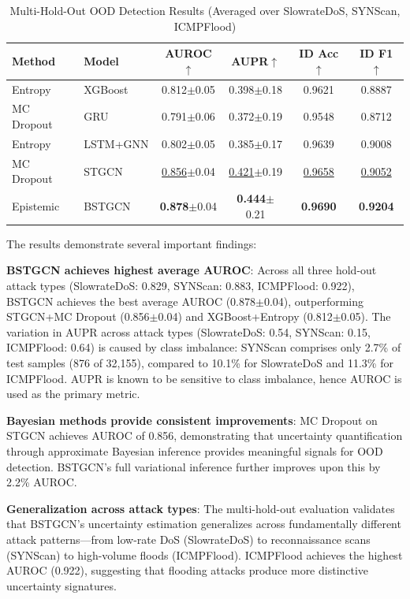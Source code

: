 \documentclass[lettersize,journal]{IEEEtran}
\begin{document}
\begin{table}[!t]
\caption{Multi-Hold-Out OOD Detection Results (Averaged over SlowrateDoS, SYNScan, ICMPFlood)\label{tab:ood_results}}
\centering
\setlength{\tabcolsep}{3pt}
\begin{tabular}{llcccc}
\toprule
\textbf{Method} & \textbf{Model} & \textbf{AUROC}$\uparrow$ & \textbf{AUPR}$\uparrow$ & \textbf{ID Acc}$\uparrow$ & \textbf{ID F1}$\uparrow$ \\
\midrule
Entropy    & XGBoost   & 0.812$\pm$0.05 & 0.398$\pm$0.18 & 0.9621 & 0.8887 \\
MC Dropout & GRU       & 0.791$\pm$0.06 & 0.372$\pm$0.19 & 0.9548 & 0.8712 \\
Entropy    & LSTM+GNN  & 0.802$\pm$0.05 & 0.385$\pm$0.17 & 0.9639 & 0.9008 \\
MC Dropout & STGCN     & \underline{0.856}$\pm$0.04 & \underline{0.421}$\pm$0.19 & \underline{0.9658} & \underline{0.9052} \\
\midrule
Epistemic  & BSTGCN    & \textbf{0.878}$\pm$0.04 & \textbf{0.444}$\pm$0.21 & \textbf{0.9690} & \textbf{0.9204} \\
\bottomrule
\end{tabular}
\end{table}


The results demonstrate several important findings:

\textbf{BSTGCN achieves highest average AUROC}: Across all three hold-out attack types (SlowrateDoS: 0.829, SYNScan: 0.883, ICMPFlood: 0.922), BSTGCN achieves the best average AUROC (0.878$\pm$0.04), outperforming STGCN+MC Dropout (0.856$\pm$0.04) and XGBoost+Entropy (0.812$\pm$0.05). The variation in AUPR across attack types (SlowrateDoS: 0.54, SYNScan: 0.15, ICMPFlood: 0.64) is caused by class imbalance: SYNScan comprises only 2.7\% of test samples (876 of 32,155), compared to 10.1\% for SlowrateDoS and 11.3\% for ICMPFlood. AUPR is known to be sensitive to class imbalance, hence AUROC is used as the primary metric.

\textbf{Bayesian methods provide consistent improvements}: MC Dropout on STGCN achieves AUROC of 0.856, demonstrating that uncertainty quantification through approximate Bayesian inference provides meaningful signals for OOD detection. BSTGCN's full variational inference further improves upon this by 2.2\% AUROC.

\textbf{Generalization across attack types}: The multi-hold-out evaluation validates that BSTGCN's uncertainty estimation generalizes across fundamentally different attack patterns---from low-rate DoS (SlowrateDoS) to reconnaissance scans (SYNScan) to high-volume floods (ICMPFlood). ICMPFlood achieves the highest AUROC (0.922), suggesting that flooding attacks produce more distinctive uncertainty signatures.
\end{document}
